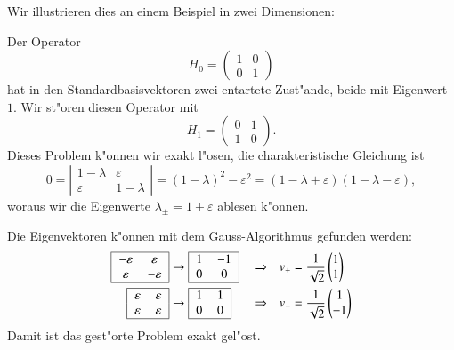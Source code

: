 Wir illustrieren dies an einem Beispiel in zwei Dimensionen:
\begin{beispiel}
Der Operator
\[
H_0=\begin{pmatrix}1&0\\0&1\end{pmatrix}
\]
hat in den Standardbasisvektoren zwei entartete Zust"ande, beide mit
Eigenwert $1$.
Wir st"oren diesen Operator mit 
\[
H_1=\begin{pmatrix} 0&1\\ 1&0 \end{pmatrix}.
\]
Dieses Problem k"onnen wir exakt l"osen, die charakteristische Gleichung
ist
\[
0=
\left|\begin{matrix}
1-\lambda&\varepsilon\\
\varepsilon&1-\lambda
\end{matrix}\right|
=(1-\lambda)^2-\varepsilon^2=(1-\lambda+\varepsilon)(1-\lambda-\varepsilon),
\]
woraus wir die Eigenwerte $\lambda_\pm = 1\pm\varepsilon$ ablesen k"onnen.

Die Eigenvektoren k"onnen mit dem Gauss-Algorithmus gefunden werden:
\[
\begin{aligned}
\begin{tabular}{|>{$}c<{$}>{$}c<{$}|}
\hline
-\varepsilon& \varepsilon\\
 \varepsilon&-\varepsilon\\
\hline
\end{tabular}
&\rightarrow
\begin{tabular}{|>{$}c<{$}>{$}c<{$}|}
\hline
1&-1\\0&0\\
\hline
\end{tabular}
&&\Rightarrow&
v_+&=\frac1{\sqrt{2}}\begin{pmatrix}1\\1\end{pmatrix}
\\
\begin{tabular}{|>{$}c<{$}>{$}c<{$}|}
\hline
 \varepsilon& \varepsilon\\
 \varepsilon& \varepsilon\\
\hline
\end{tabular}
&\rightarrow
\begin{tabular}{|>{$}c<{$}>{$}c<{$}|}
\hline
1& 1\\0&0\\
\hline
\end{tabular}
&&\Rightarrow&
v_-&=\frac1{\sqrt{2}}\begin{pmatrix}1\\-1\end{pmatrix}
\end{aligned}
\]
Damit ist das gest"orte Problem exakt gel"ost.


\end{beispiel}

